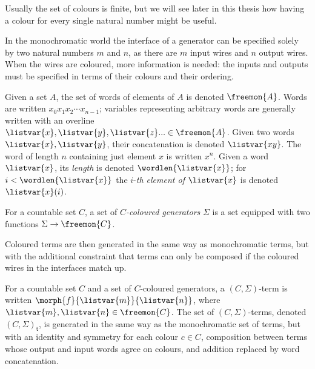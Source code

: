 \begin{remark}
    Usually the set of colours is finite, but we will see later in this thesis
    how having a colour for every single natural number might be useful.
\end{remark}

In the monochromatic world the interface of a generator can be specified solely
by two natural numbers \(m\) and \(n\), as there are \(m\) input wires and
\(n\) output wires.
When the wires are coloured, more information is needed: the inputs and outputs
must be specified in terms of their colours and their ordering.

\begin{notation}[Words]
    Given a set \(A\), the set of words of elements of \(A\) is denoted
    \(\freemon{A}\).
    Words are written \(x_0x_1x_2{\cdots}x_{n-1}\); variables representing
    arbitrary words are generally written with an
    overline \(
    \listvar{x}, \listvar{y}, \listvar{z}... \in \freemon{A}
    \).
    Given two words \(\listvar{x}, \listvar{y}\), their concatenation is
    denoted \(\listvar{xy}\).
    The word of length \(n\) containing just element \(x\) is written \(x^n\).
    Given a word \(\listvar{x}\), its \emph{length} is denoted
    \(\wordlen{\listvar{x}}\); for \(i < \wordlen{\listvar{x}}\) the
    \(i\)-\emph{th element of \(\listvar{x}\)} is denoted \(\listvar{x}(i)\).
\end{notation}

\begin{definition}
    For a countable set \(C\), a set of \emph{\(C\)-coloured generators}
    \(\Sigma\) is a set equipped with two functions \(\Sigma \to \freemon{C}\).
\end{definition}

Coloured terms are then generated in the same way as monochromatic terms, but
with the additional constraint that terms can only be composed if the coloured
wires in the interfaces match up.

\begin{definition}
    For a countable set \(C\) and a set of \(C\)-coloured generators, a
    \((C,\Sigma)\)-term is written \(\morph{f}{\listvar{m}}{\listvar{n}}\),
    where \(\listvar{m},\listvar{n} \in \freemon{C}\).
    The set of \((C,\Sigma)\)-terms, denoted \((C,\Sigma)_\mathsf{t}\), is
    generated in the same way as the monochromatic set of terms, but with an
    identity and symmetry for each colour \(c \in C\), composition between
    terms whose output and input words agree on colours, and addition replaced
    by word concatenation.
\end{definition}

